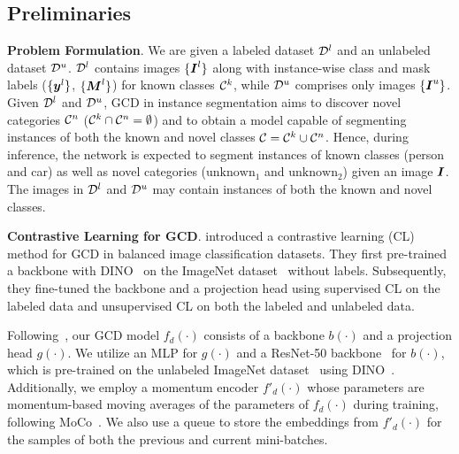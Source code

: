 \subsection{Preliminaries}
\label{sec:prelim}
\noindent \textbf{Problem Formulation}.
We are given a labeled dataset $\mathcal{D}^l$ and an unlabeled dataset $\mathcal{D}^u$. $\mathcal{D}^l$ contains images $\{\boldsymbol{I}^l\}$ along with instance-wise class and mask labels ($\{\boldsymbol{y}^l\}$, $\{\boldsymbol{M}^l\}$) for known classes $\mathcal{C}^k$, while $\mathcal{D}^u$ comprises only images $\{\boldsymbol{I}^u\}$. Given $\mathcal{D}^l$ and $\mathcal{D}^u$, GCD in instance segmentation aims to discover novel categories $\mathcal{C}^n$ (\ie $\mathcal{C}^k \cap \mathcal{C}^n = \emptyset$) and to obtain a model capable of segmenting instances of both the known and novel classes $\mathcal{C} = \mathcal{C}^k \cup \mathcal{C}^n$. Hence, during inference, the network is expected to segment instances of known classes (\eg person and car) as well as novel categories (\eg $\text{unknown}_1$ and $\text{unknown}_2$) given an image $\boldsymbol{I}$. The images in $\mathcal{D}^l$ and $\mathcal{D}^u$ may contain instances of both the known and novel classes.


\vspace{1mm}
\noindent \textbf{Contrastive Learning for GCD}. 
\cite{vaze2022generalized} introduced a contrastive learning (CL) method for GCD in balanced image classification datasets. They first pre-trained a backbone with DINO~\cite{dino2021} on the ImageNet dataset~\cite{imagenet2015} without labels. Subsequently, they fine-tuned the backbone and a projection head using supervised CL on the labeled data and unsupervised CL on both the labeled and unlabeled data. 



Following~\cite{wen2023parametric, vaze2022generalized}, our GCD model $f_d(\cdot)$ consists of a backbone $b(\cdot)$ and a projection head $g(\cdot)$. We utilize an MLP for $g(\cdot)$ and a ResNet-50 backbone~\cite{resnet} for $b(\cdot)$, which is pre-trained on the unlabeled ImageNet dataset~\cite{imagenet2015} using DINO~\cite{dino2021}. Additionally, we employ a momentum encoder $f'_d(\cdot)$ whose parameters are momentum-based moving averages of the parameters of $f_d(\cdot)$ during training, following MoCo~\cite{he2020momentum}. We also use a queue to store the embeddings from $f'_d(\cdot)$ for the samples of both the previous and current mini-batches.


